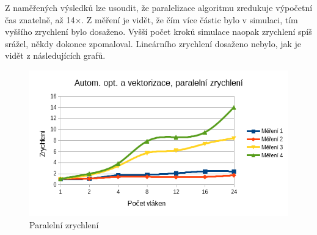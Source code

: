 \documentclass[12pt]{article}
\begin{document}
Z naměřených výsledků lze usoudit, že paralelizace algoritmu zredukuje výpočetní čas znatelně, až 14${\times}$.
Z měření je vidět, že čím více částic bylo v simulaci, tím vyššího zrychlení bylo dosaženo.
Vyšší počet kroků simulace naopak zrychlení spíš srážel, někdy dokonce zpomaloval.
Lineárního zrychlení dosaženo nebylo, jak je vidět z následujících grafů.

\begin{figure}[H]
  \begin{center}
     \includegraphics[width=12cm]{images/sdruzene/openmp/autoacc.png}
    \caption{Paralelní zrychlení} 
  \end{center}
\end{figure}
\end{document}
